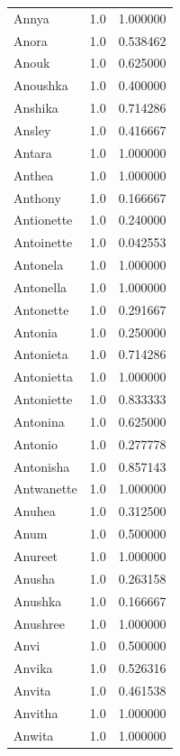 \documentclass[
  letterpaper,
  DIV=11,
  numbers=noendperiod]{scrreprt}
\begin{document}
\begin{tabular}{lrr}
Annya           &   1.0 &   1.000000 \\
Anora           &   1.0 &   0.538462 \\
Anouk           &   1.0 &   0.625000 \\
Anoushka        &   1.0 &   0.400000 \\
Anshika         &   1.0 &   0.714286 \\
Ansley          &   1.0 &   0.416667 \\
Antara          &   1.0 &   1.000000 \\
Anthea          &   1.0 &   1.000000 \\
Anthony         &   1.0 &   0.166667 \\
Antionette      &   1.0 &   0.240000 \\
Antoinette      &   1.0 &   0.042553 \\
Antonela        &   1.0 &   1.000000 \\
Antonella       &   1.0 &   1.000000 \\
Antonette       &   1.0 &   0.291667 \\
Antonia         &   1.0 &   0.250000 \\
Antonieta       &   1.0 &   0.714286 \\
Antonietta      &   1.0 &   1.000000 \\
Antoniette      &   1.0 &   0.833333 \\
Antonina        &   1.0 &   0.625000 \\
Antonio         &   1.0 &   0.277778 \\
Antonisha       &   1.0 &   0.857143 \\
Antwanette      &   1.0 &   1.000000 \\
Anuhea          &   1.0 &   0.312500 \\
Anum            &   1.0 &   0.500000 \\
Anureet         &   1.0 &   1.000000 \\
Anusha          &   1.0 &   0.263158 \\
Anushka         &   1.0 &   0.166667 \\
Anushree        &   1.0 &   1.000000 \\
Anvi            &   1.0 &   0.500000 \\
Anvika          &   1.0 &   0.526316 \\
Anvita          &   1.0 &   0.461538 \\
Anvitha         &   1.0 &   1.000000 \\
Anwita          &   1.0 &   1.000000 \\

\end{tabular}
\end{document}
